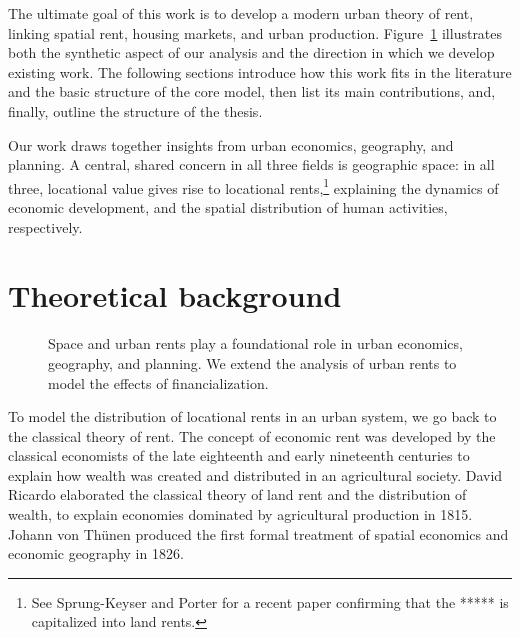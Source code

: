 
The ultimate goal of this work is to develop a modern urban theory of rent, linking \gls{spatial rent}, housing markets, and urban production. 
Figure~\ref{fig-fields} illustrates both the synthetic aspect of our analysis and the direction in which we develop existing work. The following sections introduce how this work fits in the literature and the basic structure of the core model, then list its main contributions, and, finally,  outline the structure of the thesis.

Our work draws together insights from urban economics, geography, and planning. A central, shared concern in all three fields is geographic space: in all three, locational value gives rise to locational rents,\footnote{See Sprung-Keyser and Porter \cite{medina-olivaresJointModelLongitudinal2023} for a recent paper confirming {\color{red}that the ***** is capitalized into land rents.}}  explaining the dynamics of economic development, and the spatial distribution of human activities, respectively. 

\section{Theoretical background}

    
    \begin{figure}[!ht]
    \centering
    
    \caption[Linking space and urban rents to the effects of financialization]{Space and urban rents play a foundational role in urban economics, geography, and planning. We extend the analysis of urban rents to model the effects of financialization.}
    \label{fig-fields}
    \end{figure}


To model the distribution of locational rents in an urban system, we go back to the classical theory of rent. The concept of economic rent was developed by the classical economists of the late eighteenth and early nineteenth centuries to explain how wealth was created and distributed in an agricultural society. David Ricardo \cite{ricardoEssayInfluenceLow1815} elaborated the classical theory of land rent and the distribution of wealth, to explain economies dominated by agricultural production in 1815.
Johann von Th\"unen \cite{vonthunenIsolirteStaatBeziehung1826} produced the first formal treatment of spatial economics and economic geography in 1826. 

